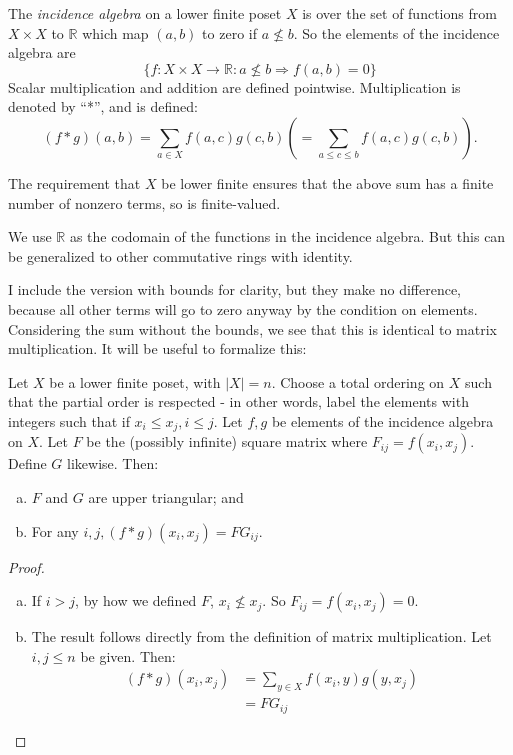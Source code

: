\documentclass[12pt]{pom_thesis}
\newcommand{\Rr}{\mathbb{R}}
\begin{document}
\begin{defn}
The \emph{incidence algebra} on a lower finite poset $X$ is over the set of functions from $X \times X$ to $\Rr$ which map $(a,b)$ to zero if $a \nleq b$. So the elements of the incidence algebra are 
\[\{f:X \times X \rightarrow \Rr:a \nleq b \Rightarrow f(a,b) = 0\}
\]
Scalar multiplication and addition are defined pointwise.  Multiplication is denoted by ``*'', and is defined:
\[(f* g)(a,b) = \sum_{a \in X}f(a,c)g(c,b) \left( = \sum_{a \leq c \leq b}f(a,c)g(c,b)\right).\]
\end{defn}
\begin{rmk}
The requirement that $X$ be lower finite ensures that the above sum has a finite number of nonzero terms, so is finite-valued.
\end{rmk}
\begin{rmk}
We use $\Rr$ as the codomain of the functions in the incidence algebra. But this can be generalized to other commutative rings with identity.
\end{rmk}
I include the version with bounds for clarity, but they make no difference, because all other terms will go to zero anyway by the condition on elements. Considering the sum without the bounds, we see that this is identical to matrix multiplication. It will be useful to formalize this:
\begin{lemma}\label{mat_eq}
Let $X$ be a lower finite poset, with $|X|=n$. Choose a total ordering on $X$ such that the partial order is respected - in other words, label the elements with integers such that if $x_i \leq x_j, i \leq j$. Let $f,g$ be elements of the incidence algebra on $X$. Let $F$ be the (possibly infinite) square matrix where $F_{ij}=f(x_i, x_j)$. Define $G$ likewise. Then:
\begin{enumerate}[a)]
\item $F$ and $G$ are upper triangular; and
\item For any $i,j, (f * g)(x_i, x_j)=FG_{ij}$.
\end{enumerate}
\end{lemma}
\begin{proof}
\begin{enumerate}[a)]
\item If $i>j$, by how we defined $F$, $x_i \nleq x_j$. So $F_{ij} = f(x_i, x_j) = 0$. 
\item
The result follows directly from the definition of matrix multiplication. Let $i,j\leq n$ be given. Then:
\begin{align*}
(f * g)(x_i, x_j) &= \sum_{y \in X} f(x_i,y)g(y,x_j)\\
&=FG_{ij}
\end{align*}
\end{enumerate}
\end{proof}
\end{document}
